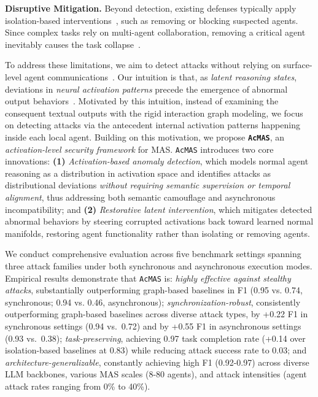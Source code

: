 \documentclass{article}
\newcommand{\app}{\texttt{AcMAS}}
\theoremstyle{plain}
\theoremstyle{definition}
\theoremstyle{remark}
\begin{document}
\textbf{ Disruptive Mitigation.}
Beyond detection, existing defenses typically apply 
isolation-based interventions~\cite{wang2025g, miao2025blindguard},
such as removing or blocking suspected agents.
Since complex tasks rely on  multi-agent collaboration,
removing a critical agent 
inevitably causes the task collapse~\cite{zhou2025corba}.


To address these limitations, we aim to detect attacks without relying on surface-level agent communications~\cite{wang2025g,miao2025blindguard}. 
Our intuition is that, as \emph{latent reasoning states}, deviations in \textit{neural activation patterns} precede the emergence of abnormal output behaviors~\cite{zhang2025controlling,zhang2025jbshield,kim2018interpretability}.
Motivated by this intuition, instead of examining the consequent textual outputs with the rigid interaction graph modeling, we focus on detecting attacks via the antecedent internal activation patterns happening inside each local agent.  
Building on this motivation, we propose 
\textbf{\app{}}, an \emph{activation-level security framework} for MAS. \app{} introduces two core innovations: 
\textbf{(1)} \emph{Activation-based anomaly detection}, which models normal
agent reasoning as a distribution in activation space and identifies attacks
as distributional deviations \emph{without requiring semantic supervision or
temporal alignment}, thus addressing both semantic camouflage and
asynchronous incompatibility; and
\textbf{(2)} \emph{Restorative latent intervention}, which mitigates detected
abnormal behaviors by steering corrupted activations back toward learned normal manifolds, restoring agent functionality rather than isolating or removing agents.



We conduct comprehensive evaluation across five benchmark settings spanning
three attack families under both synchronous and asynchronous execution modes.
Empirical results demonstrate that \app{} is:  \emph{highly effective against stealthy attacks}, 
substantially outperforming graph-based baselines in F1 (0.95 vs. 0.74, synchronous; 0.94 vs. 0.46, asynchronous);  \emph{synchronization-robust}, consistently outperforming graph-based baselines across diverse attack types, by +0.22 F1 in synchronous settings (0.94 vs.\ 0.72) and by +0.55 F1 in asynchronous settings (0.93 vs.\ 0.38);
 \emph{task-preserving}, achieving 0.97 task completion rate (+0.14 over 
isolation-based baselines at 0.83) while reducing attack success rate 
to 0.03; and  \emph{architecture-generalizable}, constantly achieving high F1 (0.92-0.97) across diverse LLM backbones, various MAS scales (8-80 agents), and attack intensities (agent attack rates ranging from 0\% to 40\%).
\end{document}
